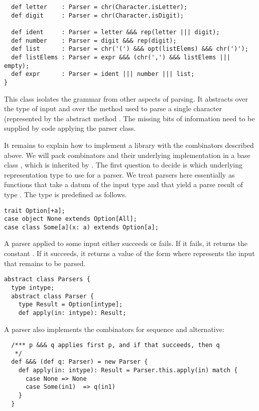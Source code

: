 \documentclass[a4paper,12pt,twoside,titlepage]{book}
\begin{document}
{\begin{lstlisting}
  def letter    : Parser = chr(Character.isLetter);
  def digit     : Parser = chr(Character.isDigit);

  def ident     : Parser = letter &&& rep(letter ||| digit);
  def number    : Parser = digit &&& rep(digit);
  def list      : Parser = chr('(') &&& opt(listElems) &&& chr(')');
  def listElems : Parser = expr &&& (chr(',') &&& listElems ||| empty);
  def expr      : Parser = ident ||| number ||| list;
}
\end{lstlisting}
This class isolates the grammar from other aspects of parsing. It
abstracts over the type of input 
and over the method used to parse a single character
(represented by the abstract method . The missing bits of information need to be supplied by code
applying the parser class.

It remains to explain how to implement a library with the combinators
described above. We will pack combinators and their underlying
implementation in a base class , which is inherited by
.  The first question to decide is which underlying
representation type to use for a parser. We treat parsers here
essentially as functions that take a datum of the input type
 and that yield a parse result of type
.  The  type is predefined as
follows.
\begin{lstlisting}
trait Option[+a];
case object None extends Option[All];
case class Some[a](x: a) extends Option[a];
\end{lstlisting}
A parser applied to some input either succeeds or fails. If it fails,
it returns the constant . If it succeeds, it returns a
value of the form  where  represents the
input that remains to be parsed.
\begin{lstlisting}
abstract class Parsers {
  type intype;
  abstract class Parser {
    type Result = Option[intype];  
    def apply(in: intype): Result;
\end{lstlisting}
A parser also implements the combinators
for sequence and alternative:
\begin{lstlisting}
  /*** p &&& q applies first p, and if that succeeds, then q
   */
  def &&& (def q: Parser) = new Parser {
    def apply(in: intype): Result = Parser.this.apply(in) match {
      case None => None
      case Some(in1)  => q(in1)
    }
  }


\end{lstlisting}}
\end{document}

